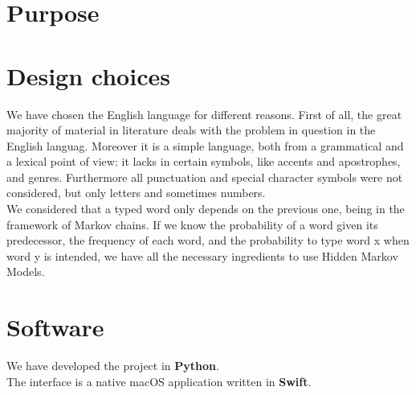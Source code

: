 \section{Purpose}

\section{Design choices}

We have chosen the English language for different reasons. First of all, the great majority of material in literature deals 
with the problem in question in the English languag. Moreover it is a simple language, both from a grammatical and a 
lexical point of view: it lacks in certain symbols, like accents and apostrophes, and genres. 
Furthermore all punctuation and special character symbols were not considered, but only letters and sometimes numbers. 
\\

We considered that a typed word only depends on the previous one, being 
in the framework of Markov chains. If we know the probability of a word 
given its predecessor, the frequency of each word, and the probability to 
type word x when word y is intended, we have all the necessary ingredients 
to use Hidden Markov Models.

\section{Software}
We have developed the project in \textbf{Python}.\\
The interface is a native macOS application written in \textbf{Swift}.
